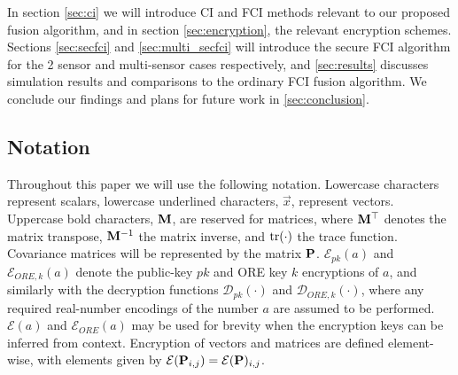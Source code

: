 \documentclass[letterpaper, 10 pt, conference]{ieeeconf}  %
\begin{document}
In section \ref{sec:ci} we will introduce CI and FCI methods relevant to our proposed fusion algorithm, and in section \ref{sec:encryption}, the relevant encryption schemes. Sections \ref{sec:secfci} and \ref{sec:multi_secfci} will introduce the secure FCI algorithm for the 2 sensor and multi-sensor cases respectively, and \ref{sec:results} discusses simulation results and comparisons to the ordinary FCI fusion algorithm. We conclude our findings and plans for future work in \ref{sec:conclusion}.


\subsection{Notation}
Throughout this paper we will use the following notation. Lowercase characters represent scalars, lowercase underlined characters, $\vec{x}$, represent vectors. Uppercase bold characters, ${{\mathbf{M}}}$, are reserved for matrices, where ${{\mathbf{M}}}^\top$ denotes the matrix transpose, ${{\mathbf{M}}}^{-1}$ the matrix inverse, and $\operatorname{tr}(\cdot)$ the trace function. Covariance matrices will be represented by the matrix ${{\mathbf{P}}}$. $\mathcal{E}_{pk}(a)$ and $\mathcal{E}_{ORE,k}(a)$ denote the public-key $pk$ and ORE key $k$ encryptions of $a$, and similarly with the decryption functions $\mathcal{D}_{pk}(\cdot)$ and $\mathcal{D}_{ORE,k}(\cdot)$, where any required real-number encodings of the number $a$ are assumed to be performed. $\mathcal{E}(a)$ and $\mathcal{E}_{ORE}(a)$ may be used for brevity when the encryption keys can be inferred from context. Encryption of vectors and matrices are defined element-wise, with elements given by $\mathcal{E}({{\mathbf{P}}}_{i,j}) = \mathcal{E}({{\mathbf{P}}})_{i,j}$.

\end{document}
